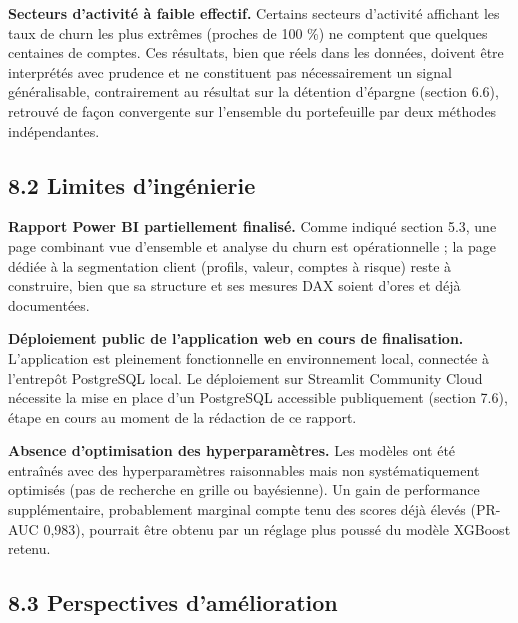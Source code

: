 \documentclass[11pt,a4paper]{article}
\begin{document}
\textbf{Secteurs d'activité à faible effectif.} Certains secteurs
d'activité affichant les taux de churn les plus extrêmes (proches de 100
\%) ne comptent que quelques centaines de comptes. Ces résultats, bien
que réels dans les données, doivent être interprétés avec prudence et ne
constituent pas nécessairement un signal généralisable, contrairement au
résultat sur la détention d'épargne (section 6.6), retrouvé de façon
convergente sur l'ensemble du portefeuille par deux méthodes
indépendantes.

\hypertarget{limites-dinguxe9nierie}{%
\subsection{8.2 Limites d'ingénierie}\label{limites-dinguxe9nierie}}

\textbf{Rapport Power BI partiellement finalisé.} Comme indiqué section
5.3, une page combinant vue d'ensemble et analyse du churn est
opérationnelle ; la page dédiée à la segmentation client (profils,
valeur, comptes à risque) reste à construire, bien que sa structure et
ses mesures DAX soient d'ores et déjà documentées.

\textbf{Déploiement public de l'application web en cours de
finalisation.} L'application est pleinement fonctionnelle en
environnement local, connectée à l'entrepôt PostgreSQL local. Le
déploiement sur Streamlit Community Cloud nécessite la mise en place
d'un PostgreSQL accessible publiquement (section 7.6), étape en cours au
moment de la rédaction de ce rapport.

\textbf{Absence d'optimisation des hyperparamètres.} Les modèles ont été
entraînés avec des hyperparamètres raisonnables mais non
systématiquement optimisés (pas de recherche en grille ou bayésienne).
Un gain de performance supplémentaire, probablement marginal compte tenu
des scores déjà élevés (PR-AUC 0,983), pourrait être obtenu par un
réglage plus poussé du modèle XGBoost retenu.

\hypertarget{perspectives-damuxe9lioration}{%
\subsection{8.3 Perspectives
d'amélioration}\label{perspectives-damuxe9lioration}}
\end{document}
